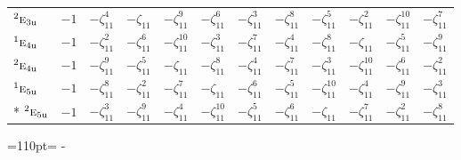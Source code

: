 \documentclass[10pt,a4paper]{article}
\newcommand{\needspace}[1]{\par\penalty-100\begingroup\dimen0=#1\relax\dimen2=\pagegoal
  \advance\dimen2-\pagetotal\ifdim\dimen0>\dimen2\relax\ifdim\dimen2>0pt\vfil\break\fi\fi
  \endgroup}
\numberwithin{equation}{section}
\newcommand{\irr}[1]{\text{\normalfont\scshape #1}}
\newcommand{\conjpair}[1]{{}^{#1}}
\newcommand{\ptag}[1]{\mathrm{#1}}
\newcommand{\rootunity}[1]{\zeta_{#1}}
\begin{document}
{\begin{longtable}{@{}lccccccccccc@{}}
$\conjpair{2}\irr{e}_{3\ptag{u}}$ & $-1$ & $-\rootunity{11}^{4}$ & $-\rootunity{11}$ & $-\rootunity{11}^{9}$ & $-\rootunity{11}^{6}$ & $-\rootunity{11}^{3}$ & $-\rootunity{11}^{8}$ & $-\rootunity{11}^{5}$ & $-\rootunity{11}^{2}$ & $-\rootunity{11}^{10}$ & $-\rootunity{11}^{7}$\\
$\conjpair{1}\irr{e}_{4\ptag{u}}$ & $-1$ & $-\rootunity{11}^{2}$ & $-\rootunity{11}^{6}$ & $-\rootunity{11}^{10}$ & $-\rootunity{11}^{3}$ & $-\rootunity{11}^{7}$ & $-\rootunity{11}^{4}$ & $-\rootunity{11}^{8}$ & $-\rootunity{11}$ & $-\rootunity{11}^{5}$ & $-\rootunity{11}^{9}$\\
$\conjpair{2}\irr{e}_{4\ptag{u}}$ & $-1$ & $-\rootunity{11}^{9}$ & $-\rootunity{11}^{5}$ & $-\rootunity{11}$ & $-\rootunity{11}^{8}$ & $-\rootunity{11}^{4}$ & $-\rootunity{11}^{7}$ & $-\rootunity{11}^{3}$ & $-\rootunity{11}^{10}$ & $-\rootunity{11}^{6}$ & $-\rootunity{11}^{2}$\\
$\conjpair{1}\irr{e}_{5\ptag{u}}$ & $-1$ & $-\rootunity{11}^{8}$ & $-\rootunity{11}^{2}$ & $-\rootunity{11}^{7}$ & $-\rootunity{11}$ & $-\rootunity{11}^{6}$ & $-\rootunity{11}^{5}$ & $-\rootunity{11}^{10}$ & $-\rootunity{11}^{4}$ & $-\rootunity{11}^{9}$ & $-\rootunity{11}^{3}$\\*
$\conjpair{2}\irr{e}_{5\ptag{u}}$ & $-1$ & $-\rootunity{11}^{3}$ & $-\rootunity{11}^{9}$ & $-\rootunity{11}^{4}$ & $-\rootunity{11}^{10}$ & $-\rootunity{11}^{5}$ & $-\rootunity{11}^{6}$ & $-\rootunity{11}$ & $-\rootunity{11}^{7}$ & $-\rootunity{11}^{2}$ & $-\rootunity{11}^{8}$\\
\bottomrule\end{longtable}}
\needspace{110pt}
\end{document}

